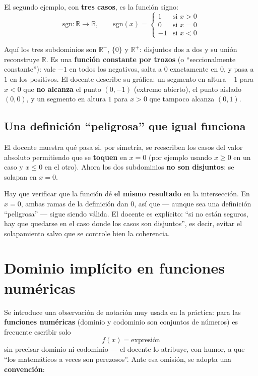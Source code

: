 \documentclass[12pt,a4paper]{article}
\begin{document}
El segundo ejemplo, con \textbf{tres casos}, es la función signo:
$$\mathrm{sgn} : \mathbb{R} \to \mathbb{R}, \qquad \mathrm{sgn}(x) = \begin{cases} 1 & \text{si } x > 0 \\ 0 & \text{si } x = 0 \\ -1 & \text{si } x < 0 \end{cases}$$

Aquí los tres subdominios son $\mathbb{R}^-$, $\{0\}$ y $\mathbb{R}^+$: disjuntos dos a dos y su unión reconstruye $\mathbb{R}$. Es una \textbf{función constante por trozos} (o ``seccionalmente constante''): vale $-1$ en todos los negativos, salta a $0$ exactamente en $0$, y pasa a $1$ en los positivos. El docente describe su gráfica: un segmento en altura $-1$ para $x<0$ que \textbf{no alcanza} el punto $(0,-1)$ (extremo abierto), el punto aislado $(0,0)$, y un segmento en altura $1$ para $x>0$ que tampoco alcanza $(0,1)$.



\subsection{Una definición ``peligrosa'' que igual funciona}

El docente muestra qué pasa si, por simetría, se reescriben los casos del valor absoluto permitiendo que se \textbf{toquen} en $x=0$ (por ejemplo usando $x \geq 0$ en un caso y $x \leq 0$ en el otro). Ahora los dos subdominios \textbf{no son disjuntos}: se solapan en $x=0$.

\begin{warnbox}
Hay que verificar que la función dé \textbf{el mismo resultado} en la intersección. En $x=0$, ambas ramas de la definición dan $0$, así que --- aunque sea una definición ``peligrosa'' --- sigue siendo válida. El docente es explícito: ``si no están seguros, hay que quedarse en el caso donde los casos son disjuntos'', es decir, evitar el solapamiento salvo que se controle bien la coherencia.
\end{warnbox}

\section{Dominio implícito en funciones numéricas}

Se introduce una observación de notación muy usada en la práctica: para las \textbf{funciones numéricas} (dominio y codominio son conjuntos de números) es frecuente escribir solo
$$f(x) = \text{expresión}$$
sin precisar dominio ni codominio --- el docente lo atribuye, con humor, a que ``los matemáticos a veces son perezosos''. Ante esa omisión, se adopta una \textbf{convención}:
\end{document}
